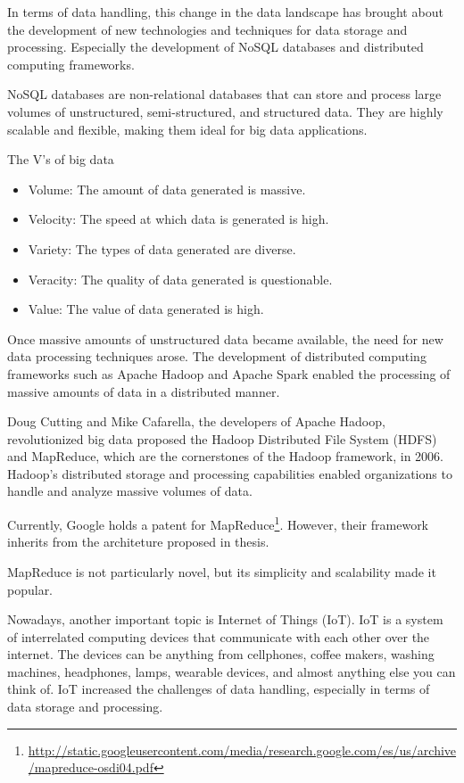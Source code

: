 In terms of data handling, this change in the data landscape has brought about the
development of new technologies and techniques for data storage and processing.  Especially
the development of NoSQL databases and distributed computing frameworks.

NoSQL databases are non-relational databases that can store and process large volumes of
unstructured, semi-structured, and structured data.  They are highly scalable and
flexible, making them ideal for big data applications.

\begin{mainbox}{The V's of big data}
  \begin{itemize}
    \item Volume: The amount of data generated is massive.
    \item Velocity: The speed at which data is generated is high.
    \item Variety: The types of data generated are diverse.
    \item Veracity: The quality of data generated is questionable.
    \item Value: The value of data generated is high.
  \end{itemize}
\end{mainbox}

Once massive amounts of unstructured data became available, the need for new data
processing techniques arose.  The development of distributed computing frameworks such as
Apache Hadoop and Apache Spark enabled the processing of massive amounts of data in a
distributed manner.

Doug Cutting and Mike Cafarella, the developers of Apache Hadoop, revolutionized big data
proposed the Hadoop Distributed File System (HDFS) and MapReduce, which are the
cornerstones of the Hadoop framework, in 2006.  Hadoop's distributed storage and
processing capabilities enabled organizations to handle and analyze massive volumes of
data.

Currently, Google holds a patent for
MapReduce\footnote{\url{http://static.googleusercontent.com/media/research.google.com/es/us/archive/mapreduce-osdi04.pdf}}.
However, their framework inherits from the architeture proposed in \textcite{Hillis1985}
thesis.

MapReduce is not particularly novel, but its simplicity and scalability made it popular.

Nowadays, another important topic is Internet of Things (IoT).  IoT is a system of
interrelated computing devices that communicate with each other over the internet.
The devices can be anything from cellphones, coffee makers, washing machines, headphones,
lamps, wearable devices, and almost anything else you can think of.  IoT increased the
challenges of data handling, especially in terms of data storage and processing.

